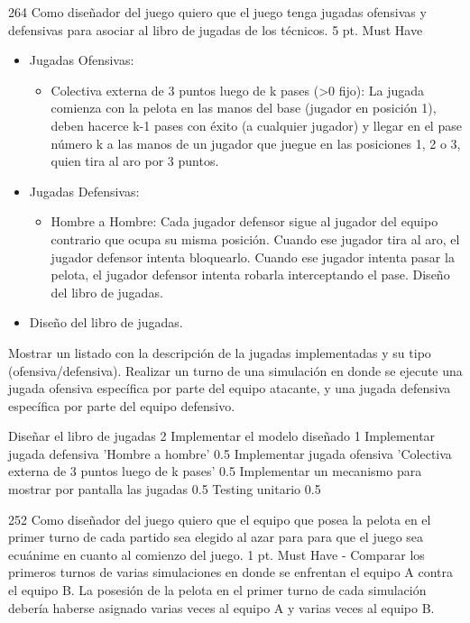 \sprintstory
{264}
{Como diseñador del juego quiero que el juego tenga jugadas ofensivas y defensivas para asociar al libro de jugadas de los técnicos.}
{5 pt.}
{Must Have}
{\begin{itemize}
  \item Jugadas Ofensivas:
  	\begin{itemize}
  		\item Colectiva externa de 3 puntos luego de k pases (\textgreater0 fijo): La jugada comienza con la pelota en las manos del base (jugador en posición 1), deben hacerce k-1 pases con éxito (a cualquier jugador) y llegar en el pase número k a las manos de un jugador que juegue en las posiciones 1, 2 o 3, quien tira al aro por 3 puntos.
  	\end{itemize}
  \item Jugadas Defensivas:
	\begin{itemize}
	  		\item Hombre a Hombre: Cada jugador defensor sigue al jugador del equipo contrario que ocupa su misma posición. Cuando ese jugador tira al aro, el jugador defensor intenta bloquearlo. Cuando ese jugador intenta pasar la pelota, el jugador defensor intenta robarla interceptando el pase. Diseño del libro de jugadas.
	\end{itemize}
  \item Diseño del libro de jugadas.
\end{itemize}}
{Mostrar un listado con la descripción de la jugadas implementadas y su tipo (ofensiva/defensiva).
Realizar un turno de una simulación en donde se ejecute una jugada ofensiva específica por parte del equipo atacante, y una jugada
defensiva específica por parte del equipo defensivo.}

\begin{taskstable}
 \task
 {Diseñar el libro de jugadas}
 {2}
 \task
 {Implementar el modelo diseñado}
 {1}
 \task
 {Implementar jugada defensiva 'Hombre a hombre'}
 {0.5}
 \task
 {Implementar jugada ofensiva 'Colectiva externa de 3 puntos luego de k pases'}
 {0.5}
 \task
 {Implementar un mecanismo para mostrar por pantalla las jugadas}
 {0.5}
 \task
 {Testing unitario}
 {0.5}

\end{taskstable}

\vspace{1cm}


\sprintstory
{252}
{Como diseñador del juego quiero que el equipo que posea la pelota en el primer turno de cada partido sea elegido al azar para para que el juego sea ecuánime en cuanto al comienzo del juego.}
{1 pt.}
{Must Have}
{-}
{Comparar los primeros turnos de varias simulaciones en donde se enfrentan el equipo A contra el equipo B. La posesión de la pelota en el primer turno de cada simulación debería haberse asignado varias veces al equipo A y varias veces al equipo B.}

